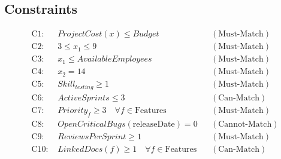 \documentclass{article}
\begin{document}
\subsection*{Constraints}
\begin{align*}
\text{C1: } & ProjectCost(x) \le Budget &&(\text{Must-Match})\\
\text{C2: } & 3 \le x_1 \le 9 &&(\text{Must-Match})\\
\text{C3: } & x_1 \le AvailableEmployees &&(\text{Must-Match})\\
\text{C4: } & x_2 = 14 &&(\text{Must-Match})\\
\text{C5: } & Skill_{testing} \ge 1 &&(\text{Must-Match})\\
\text{C6: } & ActiveSprints \le 3 &&(\text{Can-Match})\\
\text{C7: } & Priority_f \ge 3 \quad \forall f \in \text{Features} &&(\text{Must-Match})\\
\text{C8: } & OpenCriticalBugs(\text{releaseDate}) = 0 &&(\text{Cannot-Match})\\
\text{C9: } & ReviewsPerSprint \ge 1 &&(\text{Must-Match})\\
\text{C10: } & LinkedDocs(f) \ge 1 \quad \forall f \in \text{Features} &&(\text{Can-Match})
\end{align*}
\end{document}
